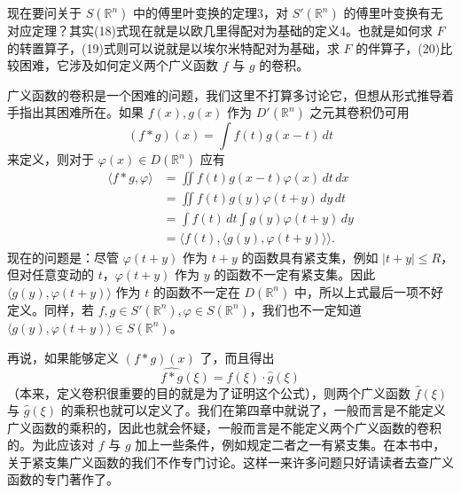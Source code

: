现在要问关于 $S(\mathbb R^n)$ 中的傅里叶变换的定理3，对 $S'(\mathbb R^n)$ 的傅里叶变换有无对应定理？其实(18)式现在就是以欧几里得配对为基础的定义4。也就是如何求 $F$ 的转置算子，(19)式则可以说就是以埃尔米特配对为基础，求 $F$ 的伴算子，(20)比较困难，它涉及如何定义两个广义函数 $f$ 与 $g$ 的卷积。

广义函数的卷积是一个困难的问题，我们这里不打算多讨论它，但想从形式推导着手指出其困难所在。如果 $f(x),g(x)$ 作为 $D'(\mathbb R^n)$ 之元其卷积仍可用
\[
 (f*g)(x)=\int f(t)g(x-t)\,dt
\]
来定义，则对于 $\varphi(x)\in D(\mathbb R^n)$ 应有
\[
 \begin{aligned}
 \langle f*g,\varphi\rangle
 &=\iint f(t)g(x-t)\varphi(x)\,dt\,dx\\
 &=\iint f(t)g(y)\varphi(t+y)\,dy\,dt\\
 &=\int f(t)\,dt\int g(y)\varphi(t+y)\,dy\\
 &=\langle f(t),\langle g(y),\varphi(t+y)\rangle\rangle.
 \end{aligned}
\]
现在的问题是：尽管 $\varphi(t+y)$ 作为 $t+y$ 的函数具有紧支集，例如 $|t+y|\le R$，但对任意变动的 $t$，$\varphi(t+y)$ 作为 $y$ 的函数不一定有紧支集。因此 $\langle g(y),\varphi(t+y)\rangle$ 作为 $t$ 的函数不一定在 $D(\mathbb R^n)$ 中，所以上式最后一项不好定义。同样，若 $f,g\in S'(\mathbb R^n),\varphi\in S(\mathbb R^n)$，我们也不一定知道 $\langle g(y),\varphi(t+y)\rangle\in S(\mathbb R^n)$。

再说，如果能够定义 $(f*g)(x)$ 了，而且得出
\[
 \widehat{f*g}(\xi)=\widehat f(\xi)\cdot\widehat g(\xi)
\]
（本来，定义卷积很重要的目的就是为了证明这个公式），则两个广义函数 $\widehat f(\xi)$ 与 $\widehat g(\xi)$ 的乘积也就可以定义了。我们在第四章中就说了，一般而言是不能定义广义函数的乘积的，因此也就会怀疑，一般而言是不能定义两个广义函数的卷积的。为此应该对 $f$ 与 $g$ 加上一些条件，例如规定二者之一有紧支集。在本书中，关于紧支集广义函数的我们不作专门讨论。这样一来许多问题只好请读者去查广义函数的专门著作了。

